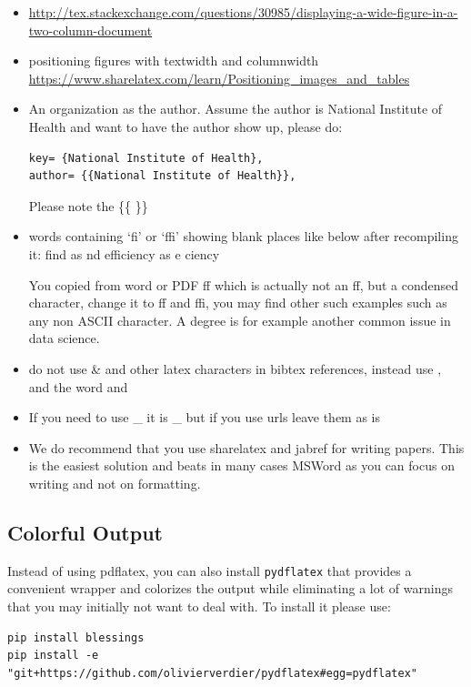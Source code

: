 \begin{itemize}
\item
  \url{http://tex.stackexchange.com/questions/30985/displaying-a-wide-figure-in-a-two-column-document}
\item
  positioning figures with textwidth and columnwidth
  \url{https://www.sharelatex.com/learn/Positioning_images_and_tables}
\item
  An organization as the author. Assume the author is National Institute
  of Health and want to have the author show up, please do:

\begin{verbatim}
key= {National Institute of Health},
author= {{National Institute of Health}},
\end{verbatim}

  Please note the \{\{ \}\}
\item
  words containing `fi' or `ffi' showing blank places like below after
  recompiling it: find as nd efficiency as e ciency

  You copied from word or PDF ff which is actually not an ff, but a
  condensed character, change it to ff and ffi, you may find other such
  examples such as any non ASCII character. A degree is for example
  another common issue in data science.
\item
  do not use \textbar{} \& and other latex characters in bibtex
  references, instead use , and the word and
\item
  If you need to use \_ it is \_ but if you use urls leave them as is
\item
  We do recommend that you use sharelatex and jabref for writing papers.
  This is the easiest solution and beats in many cases MSWord as you can
  focus on writing and not on formatting.
\end{itemize}

\subsection{Colorful Output}

Instead of using pdflatex, you can also install \verb|pydflatex| that
provides a convenient wrapper and colorizes the output while
eliminating a lot of warnings that you may initially not want to deal
with. To install it please use:

\begin{verbatim}
pip install blessings
pip install -e "git+https://github.com/olivierverdier/pydflatex#egg=pydflatex"
\end{verbatim}

